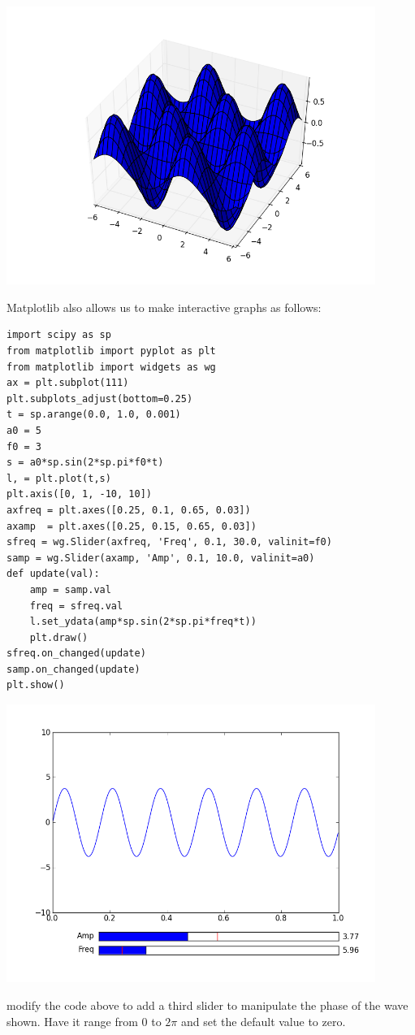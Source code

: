 \includegraphics[width=120mm]{3dplot.png}

Matplotlib also allows us to make interactive graphs as follows:


\begin{lstlisting}
import scipy as sp
from matplotlib import pyplot as plt
from matplotlib import widgets as wg
ax = plt.subplot(111)
plt.subplots_adjust(bottom=0.25)
t = sp.arange(0.0, 1.0, 0.001)
a0 = 5
f0 = 3
s = a0*sp.sin(2*sp.pi*f0*t)
l, = plt.plot(t,s)
plt.axis([0, 1, -10, 10])
axfreq = plt.axes([0.25, 0.1, 0.65, 0.03])
axamp  = plt.axes([0.25, 0.15, 0.65, 0.03])
sfreq = wg.Slider(axfreq, 'Freq', 0.1, 30.0, valinit=f0)
samp = wg.Slider(axamp, 'Amp', 0.1, 10.0, valinit=a0)
def update(val):
    amp = samp.val
    freq = sfreq.val
    l.set_ydata(amp*sp.sin(2*sp.pi*freq*t))
    plt.draw()
sfreq.on_changed(update)
samp.on_changed(update)
plt.show()
\end{lstlisting}

\includegraphics[width=120mm]{interact.png}

\begin{problem}
modify the code above to add a third slider to manipulate the phase of the wave shown. Have it range from 0 to $2\pi$ and set the default value to zero.
\end{problem}